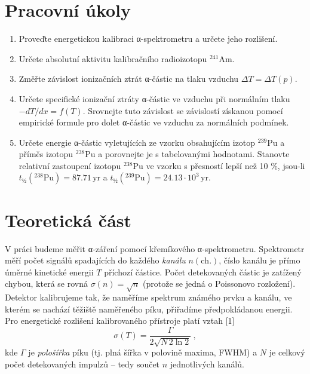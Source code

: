 \documentclass[10pt,a4paper]{article}
\renewcommand{\U}[1]{\ensuremath{\,\mathrm{#1}}}
\newcommand{\°}{\degree}
\begin{document}

\setmainfont{Linux Libertine O}




\section{Pracovní úkoly}
\begin{enumerate}
    \item Proveďte energetickou kalibraci α-spektrometru a určete jeho rozlišení.
    \item Určete absolutní aktivitu kalibračního radioizotopu $^{241}$Am.
    \item Změřte závislost ionizačních ztrát α-částic na tlaku vzduchu $\Delta T = \Delta T(p)$.
    \item Určete specifické ionizační ztráty α-částic ve vzduchu při normálním tlaku $-dT/dx = f(T)$. Srovnejte tuto závislost se závislostí získanou pomocí empirické formule pro dolet α-částic ve vzduchu za normálních podmínek.
    \item Určete energie α-částic vyletujících ze vzorku obsahujícím izotop $^{239}$Pu a příměs izotopu $^{238}$Pu a porovnejte je s tabelovanými hodnotami. Stanovte relativní zastoupení izotopu $^{238}$Pu ve vzorku s přesností lepší než 10 \%, jsou-li $t_½({}^{238}\text{Pu}) = 87.71 \U{yr}$ a $t_½({}^{239}\text{Pu}) = 24.13 \cdot 10^3 \U{yr}$.
\end{enumerate}

\section{Teoretická část}
V práci budeme měřit α-záření pomocí křemíkového α-spektrometru. Spektrometr měří počet signálů spadajících do každého \textit{kanálu} $n(\mathrm{ch.})$, číslo kanálu je přímo úměrné kinetické energii $T$ příchozí částice. Počet detekovaných částic je zatížený chybou, která se rovná $\sigma(n) = \sqrt{n}$ (protože se jedná o Poissonovo rozložení). Detektor kalibrujeme tak, že naměříme spektrum známého prvku a kanálu, ve kterém se nachází těžiště naměřeného píku, přiřadíme předpokládanou energii. Pro energetické rozlišení kalibrovaného přístroje platí vztah [1]
\begin{equation}
    \sigma(T) = \frac{\Gamma}{2 \sqrt{N \, 2 \ln 2}} \: ,
    \label{eq-energie-neurcitost}
\end{equation}
kde $\Gamma$ je \textit{pološířka} píku (tj. plná šířka v polovině maxima, FWHM) a $N$ je celkový počet detekovaných impulzů – tedy součet $n$ jednotlivých kanálů.
\end{document}
